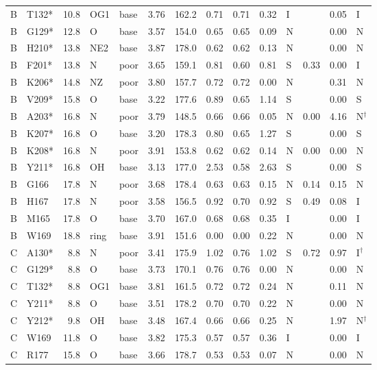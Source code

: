 \documentclass[journal=jcisd8,manuscript=suppinfo]{achemso}
\begin{document}
\begin{singlespace}
{\begin{longtable}{llrllrrrrrlrrl}
B & T132* & 10.8 & OG1 & base & 3.76 & 162.2 & 0.71 & 0.71 & 0.32 & I &  & 0.05 & I\\
B & G129* & 12.8 & O & base & 3.57 & 154.0 & 0.65 & 0.65 & 0.09 & N &  & 0.00 & N\\
B & H210* & 13.8 & NE2 & base & 3.87 & 178.0 & 0.62 & 0.62 & 0.13 & N &  & 0.00 & N\\
B & F201* & 13.8 & N & poor & 3.65 & 159.1 & 0.81 & 0.60 & 0.81 & S & 0.33 & 0.00 & I\\
B & K206* & 14.8 & NZ & poor & 3.80 & 157.7 & 0.72 & 0.72 & 0.00 & N &  & 0.31 & N\\
B & V209* & 15.8 & O & base & 3.22 & 177.6 & 0.89 & 0.65 & 1.14 & S &  & 0.00 & S\\
B & A203* & 16.8 & N & poor & 3.79 & 148.5 & 0.66 & 0.66 & 0.05 & N & 0.00 & 4.16 & N$^\dagger$\\
B & K207* & 16.8 & O & base & 3.20 & 178.3 & 0.80 & 0.65 & 1.27 & S &  & 0.00 & S\\
B & K208* & 16.8 & N & poor & 3.91 & 153.8 & 0.62 & 0.62 & 0.14 & N & 0.00 & 0.00 & N\\
B & Y211* & 16.8 & OH & base & 3.13 & 177.0 & 2.53 & 0.58 & 2.63 & S &  & 0.00 & S\\
B & G166 & 17.8 & N & poor & 3.68 & 178.4 & 0.63 & 0.63 & 0.15 & N & 0.14 & 0.15 & N\\
B & H167 & 17.8 & N & poor & 3.58 & 156.5 & 0.92 & 0.70 & 0.92 & S & 0.49 & 0.08 & I\\
B & M165 & 17.8 & O & base & 3.70 & 167.0 & 0.68 & 0.68 & 0.35 & I &  & 0.00 & I\\
B & W169 & 18.8 & ring & base & 3.91 & 151.6 & 0.00 & 0.00 & 0.22 & N &  & 0.00 & N\\
C & A130* & 8.8 & N & poor & 3.41 & 175.9 & 1.02 & 0.76 & 1.02 & S & 0.72 & 0.97 & I$^\dagger$\\
C & G129* & 8.8 & O & base & 3.73 & 170.1 & 0.76 & 0.76 & 0.00 & N &  & 0.00 & N\\
C & T132* & 8.8 & OG1 & base & 3.81 & 161.5 & 0.72 & 0.72 & 0.24 & N &  & 0.11 & N\\
C & Y211* & 8.8 & O & base & 3.51 & 178.2 & 0.70 & 0.70 & 0.22 & N &  & 0.00 & N\\
C & Y212* & 9.8 & OH & base & 3.48 & 167.4 & 0.66 & 0.66 & 0.25 & N &  & 1.97 & N$^\dagger$\\
C & W169 & 11.8 & O & base & 3.82 & 175.3 & 0.57 & 0.57 & 0.36 & I &  & 0.00 & I\\
C & R177 & 15.8 & O & base & 3.66 & 178.7 & 0.53 & 0.53 & 0.07 & N &  & 0.00 & N\\

\end{longtable}}
\end{singlespace}
\end{document}
